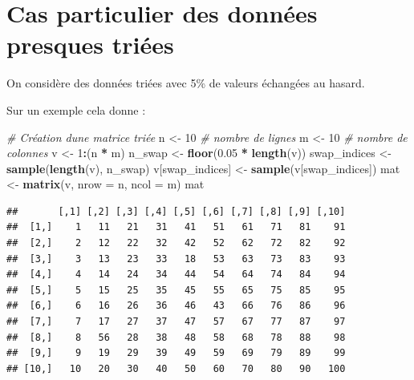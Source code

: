 \documentclass[
]{article}
\newenvironment{Shaded}{\begin{snugshade}}{\end{snugshade}}
\newcommand{\AttributeTok}[1]{\textcolor[rgb]{0.13,0.29,0.53}{#1}}
\newcommand{\CommentTok}[1]{\textcolor[rgb]{0.56,0.35,0.01}{\textit{#1}}}
\newcommand{\DecValTok}[1]{\textcolor[rgb]{0.00,0.00,0.81}{#1}}
\newcommand{\FloatTok}[1]{\textcolor[rgb]{0.00,0.00,0.81}{#1}}
\newcommand{\FunctionTok}[1]{\textcolor[rgb]{0.13,0.29,0.53}{\textbf{#1}}}
\newcommand{\NormalTok}[1]{#1}
\newcommand{\OtherTok}[1]{\textcolor[rgb]{0.56,0.35,0.01}{#1}}
\newcommand{\SpecialCharTok}[1]{\textcolor[rgb]{0.81,0.36,0.00}{\textbf{#1}}}
\begin{document}
\section{Cas particulier des données presques
triées}\label{cas-particulier-des-donnuxe9es-presques-triuxe9es}

On considère des données triées avec 5\% de valeurs échangées au hasard.

Sur un exemple cela donne :

\begin{Shaded}
\begin{Highlighting}[]
\CommentTok{\# Création d\textquotesingle{}une matrice triée}
\NormalTok{n }\OtherTok{\textless{}{-}} \DecValTok{10}  \CommentTok{\# nombre de lignes}
\NormalTok{m }\OtherTok{\textless{}{-}} \DecValTok{10}  \CommentTok{\# nombre de colonnes}
\NormalTok{v }\OtherTok{\textless{}{-}} \DecValTok{1}\SpecialCharTok{:}\NormalTok{(n }\SpecialCharTok{*}\NormalTok{ m)}
\NormalTok{n\_swap }\OtherTok{\textless{}{-}} \FunctionTok{floor}\NormalTok{(}\FloatTok{0.05} \SpecialCharTok{*} \FunctionTok{length}\NormalTok{(v))}
\NormalTok{swap\_indices }\OtherTok{\textless{}{-}} \FunctionTok{sample}\NormalTok{(}\FunctionTok{length}\NormalTok{(v), n\_swap)}
\NormalTok{v[swap\_indices] }\OtherTok{\textless{}{-}} \FunctionTok{sample}\NormalTok{(v[swap\_indices])}
\NormalTok{mat }\OtherTok{\textless{}{-}} \FunctionTok{matrix}\NormalTok{(v, }\AttributeTok{nrow =}\NormalTok{ n, }\AttributeTok{ncol =}\NormalTok{ m)}
\NormalTok{mat}
\end{Highlighting}
\end{Shaded}

\begin{verbatim}
##       [,1] [,2] [,3] [,4] [,5] [,6] [,7] [,8] [,9] [,10]
##  [1,]    1   11   21   31   41   51   61   71   81    91
##  [2,]    2   12   22   32   42   52   62   72   82    92
##  [3,]    3   13   23   33   18   53   63   73   83    93
##  [4,]    4   14   24   34   44   54   64   74   84    94
##  [5,]    5   15   25   35   45   55   65   75   85    95
##  [6,]    6   16   26   36   46   43   66   76   86    96
##  [7,]    7   17   27   37   47   57   67   77   87    97
##  [8,]    8   56   28   38   48   58   68   78   88    98
##  [9,]    9   19   29   39   49   59   69   79   89    99
## [10,]   10   20   30   40   50   60   70   80   90   100
\end{verbatim}
\end{document}
